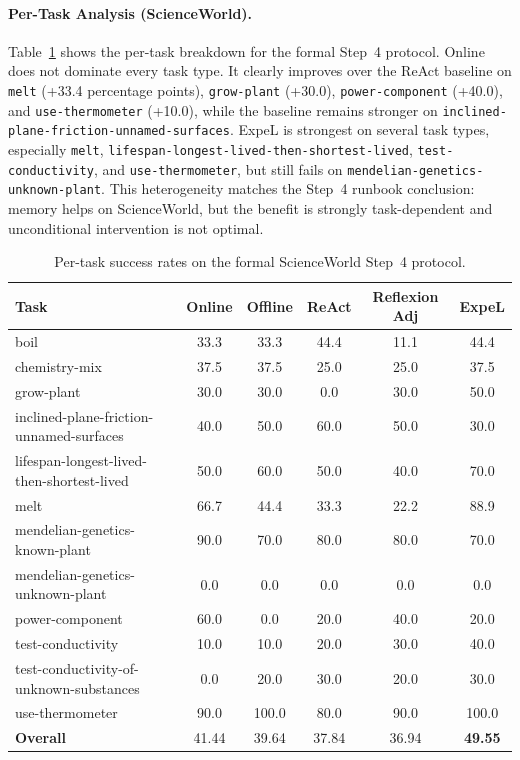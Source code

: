 \paragraph{Per-Task Analysis (ScienceWorld).}
Table~\ref{tab:sw_per_task} shows the per-task breakdown for the formal Step~4 protocol. Online \method{} does not dominate every task type. It clearly improves over the ReAct baseline on \texttt{melt} (+33.4 percentage points), \texttt{grow-plant} (+30.0), \texttt{power-component} (+40.0), and \texttt{use-thermometer} (+10.0), while the baseline remains stronger on \texttt{inclined-plane-friction-unnamed-surfaces}. ExpeL is strongest on several task types, especially \texttt{melt}, \texttt{lifespan-longest-lived-then-shortest-lived}, \texttt{test-conductivity}, and \texttt{use-thermometer}, but still fails on \texttt{mendelian-genetics-unknown-plant}. This heterogeneity matches the Step~4 runbook conclusion: memory helps on ScienceWorld, but the benefit is strongly task-dependent and unconditional intervention is not optimal.

\begin{table}[t]
\centering
\caption{Per-task success rates on the formal ScienceWorld Step~4 protocol.}
\label{tab:sw_per_task}
\small
\setlength{\tabcolsep}{3pt}
\begin{tabular}{p{3.5cm}ccccc}
\toprule
Task & Online & Offline & ReAct & Reflexion Adj & ExpeL \\
\midrule
boil & 33.3 & 33.3 & 44.4 & 11.1 & 44.4 \\
chemistry-mix & 37.5 & 37.5 & 25.0 & 25.0 & 37.5 \\
grow-plant & 30.0 & 30.0 & 0.0 & 30.0 & 50.0 \\
inclined-plane-friction-unnamed-surfaces & 40.0 & 50.0 & 60.0 & 50.0 & 30.0 \\
lifespan-longest-lived-then-shortest-lived & 50.0 & 60.0 & 50.0 & 40.0 & 70.0 \\
melt & 66.7 & 44.4 & 33.3 & 22.2 & 88.9 \\
mendelian-genetics-known-plant & 90.0 & 70.0 & 80.0 & 80.0 & 70.0 \\
mendelian-genetics-unknown-plant & 0.0 & 0.0 & 0.0 & 0.0 & 0.0 \\
power-component & 60.0 & 0.0 & 20.0 & 40.0 & 20.0 \\
test-conductivity & 10.0 & 10.0 & 20.0 & 30.0 & 40.0 \\
test-conductivity-of-unknown-substances & 0.0 & 20.0 & 30.0 & 20.0 & 30.0 \\
use-thermometer & 90.0 & 100.0 & 80.0 & 90.0 & 100.0 \\
\midrule
\textbf{Overall} & 41.44 & 39.64 & 37.84 & 36.94 & \textbf{49.55} \\
\bottomrule
\end{tabular}
\end{table}

